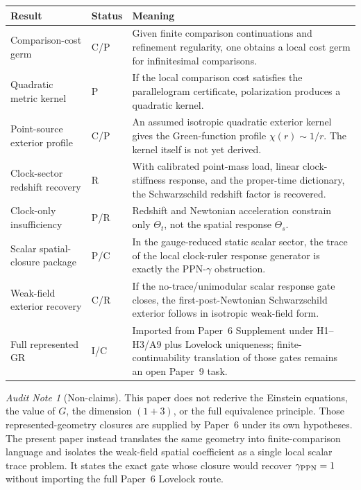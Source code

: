 \documentclass[11pt]{article}
\theoremstyle{remark}
\newtheorem{audit}[theorem]{Audit Note}
\newcommand{\Status}[1]{\textsf{#1}}
\begin{document}
\begin{longtable}{p{}p{}p{}}
\toprule
Result & Status & Meaning \\
\midrule
Comparison-cost germ & \Status{C/P} & Given finite comparison continuations and refinement regularity, one obtains a local cost germ for infinitesimal comparisons. \\
Quadratic metric kernel & \Status{P} & If the local comparison cost satisfies the parallelogram certificate, polarization produces a quadratic kernel. \\
Point-source exterior profile & \Status{C/P} & An assumed isotropic quadratic exterior kernel gives the Green-function profile \(\chi(r)\sim1/r\).  The kernel itself is not yet derived. \\
Clock-sector redshift recovery & \Status{R} & With calibrated point-mass load, linear clock-stiffness response, and the proper-time dictionary, the Schwarzschild redshift factor is recovered. \\
Clock-only insufficiency & \Status{P/R} & Redshift and Newtonian acceleration constrain only \(\Theta_t\), not the spatial response \(\Theta_s\). \\
Scalar spatial-closure package & \Status{P/C} & In the gauge-reduced static scalar sector, the trace of the local clock-ruler response generator is exactly the PPN-\(\gamma\) obstruction. \\
Weak-field exterior recovery & \Status{C/R} & If the no-trace/unimodular scalar response gate closes, the first-post-Newtonian Schwarzschild exterior follows in isotropic weak-field form. \\
Full represented GR & \Status{I/C} & Imported from Paper~6 Supplement under H1--H3/A9 plus Lovelock uniqueness; finite-continuability translation of those gates remains an open Paper~9 task. \\
\bottomrule
\end{longtable}

\begin{audit}[Non-claims]
This paper does not rederive the Einstein equations, the value of \(G\), the dimension \((1+3)\), or the full equivalence principle.  Those represented-geometry closures are supplied by Paper~6 under its own hypotheses.  The present paper instead translates the same geometry into finite-comparison language and isolates the weak-field spatial coefficient as a single local scalar trace problem.  It states the exact gate whose closure would recover \(\gamma_{\rm PPN}=1\) without importing the full Paper~6 Lovelock route.
\end{audit}
\end{document}

